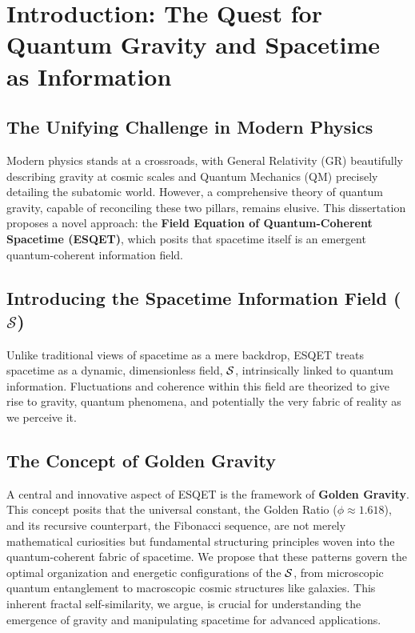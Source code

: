 \chapter{Introduction: The Quest for Quantum Gravity and Spacetime as Information}
\label{ch:introduction}

\section{The Unifying Challenge in Modern Physics}
Modern physics stands at a crossroads, with General Relativity (GR) beautifully describing gravity at cosmic scales and Quantum Mechanics (QM) precisely detailing the subatomic world. However, a comprehensive theory of quantum gravity, capable of reconciling these two pillars, remains elusive. This dissertation proposes a novel approach: the \textbf{Field Equation of Quantum-Coherent Spacetime (ESQET)}, which posits that spacetime itself is an emergent quantum-coherent information field.

\section{Introducing the Spacetime Information Field ($\mathcal{S}$)}
Unlike traditional views of spacetime as a mere backdrop, ESQET treats spacetime as a dynamic, dimensionless field, $\mathcal{S}$, intrinsically linked to quantum information. Fluctuations and coherence within this field are theorized to give rise to gravity, quantum phenomena, and potentially the very fabric of reality as we perceive it.

\section{The Concept of Golden Gravity}
A central and innovative aspect of ESQET is the framework of \textbf{Golden Gravity}. This concept posits that the universal constant, the Golden Ratio ($\phi \approx 1.618$), and its recursive counterpart, the Fibonacci sequence, are not merely mathematical curiosities but fundamental structuring principles woven into the quantum-coherent fabric of spacetime. We propose that these patterns govern the optimal organization and energetic configurations of the $\mathcal{S}$, from microscopic quantum entanglement to macroscopic cosmic structures like galaxies. This inherent fractal self-similarity, we argue, is crucial for understanding the emergence of gravity and manipulating spacetime for advanced applications.


